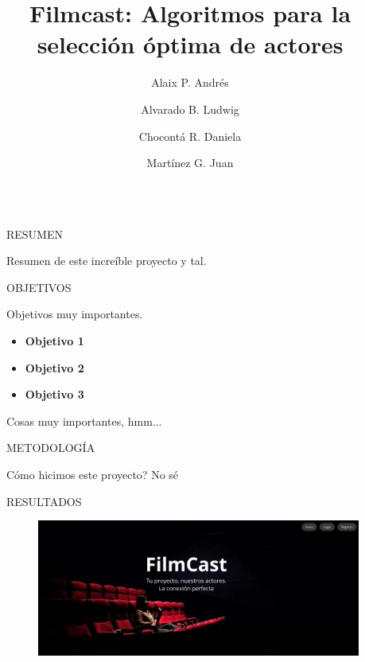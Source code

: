 \documentclass[final]{beamer}
\title{Filmcast: Algoritmos para la selección óptima de actores}
\author{Alaix P. Andrés \and Alvarado B. Ludwig \and Chocontá R. Daniela \and Martínez G. Juan  }
\newlength{\sepwidth}
\newlength{\colwidth}
\newcommand{\separatorcolumn}{\begin{column}{\sepwidth}\end{column}}
\begin{document}

\begin{frame}[t]
\begin{columns}[t]
\separatorcolumn

\begin{column}{\colwidth}

  \begin{block}{RESUMEN}

    Resumen de este increíble proyecto y tal.

  \end{block}

  \begin{block}{OBJETIVOS}

    Objetivos muy importantes.

    \begin{itemize}
      \item \textbf{Objetivo 1}
      \item \textbf{Objetivo 2}
      \item \textbf{Objetivo 3}
    \end{itemize}

    Cosas muy importantes, hmm...

  \end{block}

  \begin{alertblock}{METODOLOGÍA}

    Cómo hicimos este proyecto? No sé

  \end{alertblock}

 \begin{block}{RESULTADOS}

   \begin{figure}[H]
     \centering
     \includegraphics[width=\linewidth]{logos/webapp.png}
   \end{figure}


\end{block}
\end{column}
\end{columns}
\end{frame}
\end{document}
